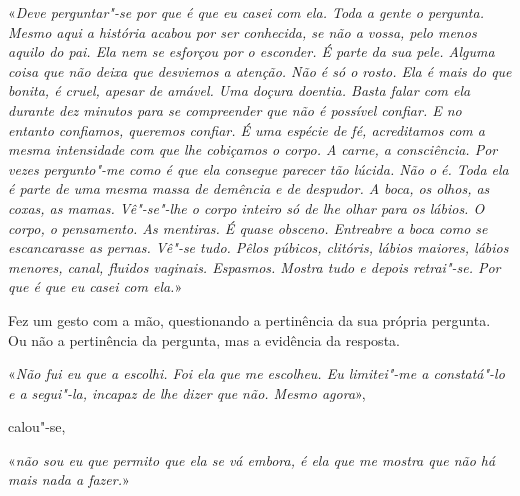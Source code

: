 «\emph{Deve perguntar"-se por que é que eu casei com ela. Toda a gente o
pergunta. Mesmo aqui a história acabou por ser conhecida, se não a
vossa, pelo menos aquilo do pai. Ela nem se esforçou por o esconder. É
parte da sua pele. Alguma coisa que não deixa que desviemos a atenção.
Não é só o rosto. Ela é mais do que bonita, é cruel, apesar de amável.
Uma doçura doentia. Basta falar com ela durante dez minutos para se
compreender que não é possível confiar. E no entanto confiamos, queremos
confiar. É uma espécie de fé, acreditamos com a mesma intensidade com
que lhe cobiçamos o corpo. A carne, a consciência. Por vezes
pergunto"-me como é que ela consegue parecer tão lúcida. Não o é. Toda
ela é parte de uma mesma massa de demência e de despudor. A boca, os
olhos, as coxas, as mamas. Vê"-se"-lhe o corpo inteiro só de lhe olhar
para os lábios. O corpo, o pensamento. As mentiras. É quase obsceno.
Entreabre a boca como se escancarasse as pernas. Vê"-se tudo. Pêlos
púbicos, clitóris, lábios maiores, lábios menores, canal, fluidos
vaginais. Espasmos. Mostra tudo e depois retrai"-se. Por que é que eu
casei com ela.}»

Fez um gesto com a mão, questionando a pertinência da sua própria
pergunta. Ou não a pertinência da pergunta, mas a evidência da resposta.

«\emph{Não fui eu que a escolhi. Foi ela que me escolheu. Eu limitei"-me
a constatá"-lo e a segui"-la, incapaz de lhe dizer que não. Mesmo
agora}»,

calou"-se,

«\emph{não sou eu que permito que ela se vá embora, é ela que me mostra
que não há mais nada a fazer.}»

